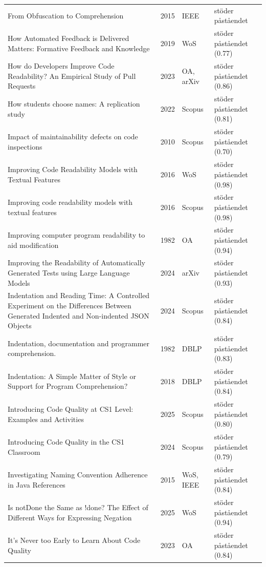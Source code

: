 \begin{longtable}{@{}%
  >{\raggedright\arraybackslash}p{}c%
  >{\raggedright\arraybackslash}p{}%
  >{\raggedright\arraybackslash}p{}@{}}
From Obfuscation to Comprehension & 2015 & IEEE & stöder påståendet \\
How Automated Feedback is Delivered Matters: Formative Feedback and Knowledge & 2019 & WoS & stöder påståendet (0.77) \\
How do Developers Improve Code Readability? An Empirical Study of Pull Requests & 2023 & OA, arXiv & stöder påståendet (0.86) \\
How students choose names: A replication study & 2022 & Scopus & stöder påståendet (0.81) \\
Impact of maintainability defects on code inspections & 2010 & Scopus & stöder påståendet (0.70) \\
Improving Code Readability Models with Textual Features & 2016 & WoS & stöder påståendet (0.98) \\
Improving code readability models with textual features & 2016 & Scopus & stöder påståendet (0.98) \\
Improving computer program readability to aid modification & 1982 & OA & stöder påståendet (0.94) \\
Improving the Readability of Automatically Generated Tests using Large Language Models & 2024 & arXiv & stöder påståendet (0.93) \\
Indentation and Reading Time: A Controlled Experiment on the Differences Between Generated Indented and Non-indented JSON Objects & 2024 & Scopus & stöder påståendet (0.84) \\
Indentation, documentation and programmer comprehension. & 1982 & DBLP & stöder påståendet (0.83) \\
Indentation: A Simple Matter of Style or Support for Program Comprehension? & 2018 & DBLP & stöder påståendet (0.84) \\
Introducing Code Quality at CS1 Level: Examples and Activities & 2025 & Scopus & stöder påståendet (0.80) \\
Introducing Code Quality in the CS1 Classroom & 2024 & Scopus & stöder påståendet (0.79) \\
Investigating Naming Convention Adherence in Java References & 2015 & WoS, IEEE & stöder påståendet (0.84) \\
Is \textquotedbl{}notDone\textquotedbl{} the Same as \textquotedbl{}!done\textquotedbl{}? The Effect of Different Ways for Expressing Negation & 2025 & WoS & stöder påståendet (0.94) \\
It's Never too Early to Learn About Code Quality & 2023 & OA & stöder påståendet (0.84) \\

\end{longtable}
